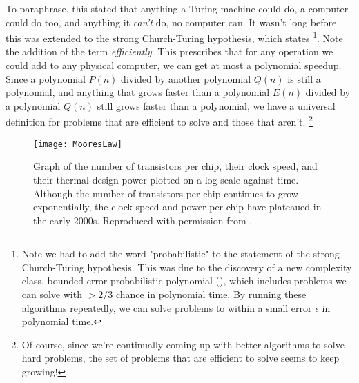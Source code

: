 To paraphrase, this stated that anything a Turing machine could do, a computer could do too, and anything
it \emph{can't} do, no computer can. It wasn't long before this was extended to the strong Church-Turing
hypothesis, which states \footnote{Note we had to add the word "probabilistic" to the statement of the strong
 Church-Turing hypothesis. This was due to the discovery of a new complexity class, bounded-error probabilistic polynomial (),
 which includes problems  we can solve with $> 2/3$ chance in polynomial time. By running these algorithms repeatedly, we can solve
 problems to within a small error $\epsilon$ in polynomial time.}.
Note the addition of the term \emph{efficiently}. This prescribes that for any
operation we could add to any physical computer, we can get at most a polynomial speedup. Since
a polynomial $P(n)$ divided by another polynomial $Q(n)$ is still a polynomial, and anything that grows faster
than a polynomial $E(n)$ divided by a polynomial $Q(n)$ still grows faster than a polynomial, we have
a universal definition for problems that are efficient to solve and those that aren't.
\footnote{Of course, since we're continually coming up with better algorithms to solve hard problems,
the set of problems that are efficient to solve seems to keep growing!}


\begin{figure}
  \texttt{[image: MooresLaw]}
  \caption[Moore's Law and the end of exponential scaling]
  {Graph of the number of transistors per chip, their clock speed, and their
  thermal design power plotted on a log scale against time. Although the number of transistors per chip
  continues to grow exponentially, the clock speed and power per chip have plateaued in the early 2000s.
  Reproduced with permission from \cite{cross_2016}.}
  \label{fig:mooreslaw}
\end{figure}

